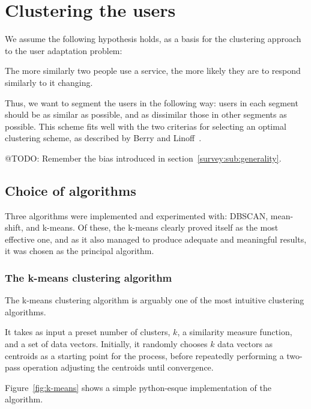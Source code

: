 \section{Clustering the users}
\label{approach:sec:clustering}

We assume the following hypothesis holds, as a basis for the clustering approach to the user adaptation problem:

\begin{hypothesis}
The more similarly two people use a service, the more likely they are to respond similarly to it changing.
\end{hypothesis}

Thus, we want to segment the users in the following way: users in each segment should be as similar as possible, and as dissimilar those in other segments as possible. This scheme fits well with the two criterias for selecting an optimal clustering scheme, as described by Berry and Linoff~\cite{Berry1997}.

@TODO: Remember the bias introduced in section~\ref{survey:sub:generality}.

\subsection{Choice of algorithms}
\label{approach:sec:clustering_algorithms}

Three algorithms were implemented and experimented with: DBSCAN, mean-shift, and k-means. Of these, the k-means clearly proved itself as the most effective one, and as it also managed to produce adequate and meaningful results, it was chosen as the principal algorithm.

\subsubsection{The k-means clustering algorithm}
\label{subs:kmeans}

The k-means clustering algorithm is arguably one of the most intuitive clustering algorithms.

It takes as input a preset number of clusters, $k$, a similarity measure function, and a set of data vectors. Initially, it randomly chooses $k$ data vectors as centroids as a starting point for the process, before repeatedly performing a two-pass operation adjusting the centroids until convergence.

Figure~\ref{fig:k-means} shows a simple python-esque implementation of the algorithm.

